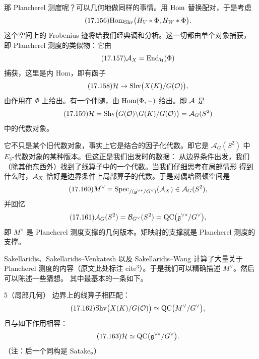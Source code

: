 那 Plancherel 测度呢？可以几何地做同样的事情。用 $\mathrm{Hom}$ 替换配对，于是考虑
\begin{equation}\tag{17.156}\label{eq:17.156}
\mathrm{Hom}_{\mathrm{Shv}}\bigl(H_V*\Phi,H_W*\Phi\bigr).
\end{equation}
这个空间上的 Frobenius 迹将给我们经典调和分析。这一切都由单个对象捕获，
即 Plancherel 测度的类似物：它由
\begin{equation}\tag{17.157}\label{eq:17.157}
\mathcal{A}_X=\mathrm{End}_{\mathcal{H}}(\Phi)
\end{equation}
捕获，这里是内 Hom，即有函子
\begin{equation}\tag{17.158}\label{eq:17.158}
\mathcal{H}\to\mathrm{Shv}\bigl(X(K)/G(\mathcal{O})\bigr),
\end{equation}
由作用在 $\Phi$ 上给出。有一个伴随，由 $\mathrm{Hom}(\Phi,-)$ 给出。即 $\mathcal{A}$ 是
\begin{equation}\tag{17.159}\label{eq:17.159}
\mathcal{H}=\mathrm{Shv}\bigl(G(\mathcal{O})\backslash G(K)/G(\mathcal{O})\bigr)=\mathcal A_G(S^2)
\end{equation}
中的代数对象。

它不只是某个旧代数对象，事实上它是结合的因子化代数。即它是
$\mathcal A_G(S^2)$ 中 $E_3$-代数对象的某种版本。但这正是我们出发时的数据：
从边界条件出发，我们（除其他东西外）找到了线算子中的一个代数。当我们仔细思考在局部情形
得到什么时，$\mathcal{A}_X$ 恰好是边界条件上局部算子的代数。于是对偶哈密顿空间是
\begin{equation}\tag{17.160}\label{eq:17.160}
M^{\vee}=\mathrm{Spec}_{/(\mathfrak g^{\vee*}/G^{\vee})}(\mathcal{A}_X)
\in\mathcal A_G(S^2),
\end{equation}
并回忆
\begin{equation}\tag{17.161}\label{eq:17.161}
\mathcal A_G(S^2)=\mathcal B_{G^{\vee}}(S^2)
=\mathrm{QC}\bigl(\mathfrak g^{\vee*}/G^{\vee}\bigr),
\end{equation}
即 $M^{\vee}$ 是 Plancherel 测度支撑的几何版本。矩映射的支撑就是 Plancherel 测度的支撑。

Sakellaridis、Sakellaridis--Venkatesh 以及 Sakellaridis--Wang 计算了大量关于 Plancherel
测度的内容（原文此处标注 cite$^3$）。于是我们可以精确描述 $M^{\vee}$。然后可以陈述一些猜想。
其中最基本的一条如下。

\begin{srcconj}{5}（局部几何）
边界上的线算子相匹配：
\begin{equation}\tag{17.162}\label{eq:17.162}
\mathrm{Shv}\bigl(X(K)/G(\mathcal{O})\bigr)\simeq\mathrm{QC}\bigl(M^{\vee}/G^{\vee}\bigr),
\end{equation}
且与如下作用相容：
\begin{equation}\tag{17.163}\label{eq:17.163}
\mathcal{H}\simeq\mathrm{QC}\bigl(\mathfrak g^{\vee*}/G^{\vee}\bigr).
\end{equation}
（注：后一个同构是 Satake。）
\end{srcconj}

